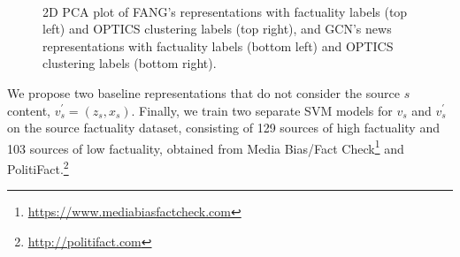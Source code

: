\documentclass[sigconf]{acmart}
\theoremstyle{definition}
\theoremstyle{hypothesis}
\begin{document}
\begin{figure}[t]
\\
\caption{2D PCA plot of FANG's representations with factuality labels (top left) and OPTICS clustering labels (top right), and GCN's news representations with factuality labels (bottom left) and OPTICS clustering labels (bottom right).}
\label{fig:fang_rep}
\end{figure}

We propose two baseline representations that do not consider the source $s$ content, $v^{\prime}_s=(z_s,x_s)$. Finally, we train two separate SVM models for $v_s$ and $v^{\prime}_s$ on the source factuality dataset, consisting of 129 sources of high factuality and 103 sources of low factuality,
obtained from Media Bias/Fact Check\footnote{\scriptsize{\url{https://www.mediabiasfactcheck.com}}} 
and PolitiFact.\footnote{\scriptsize{\url{http://politifact.com}}}
\end{document}

